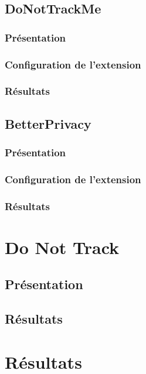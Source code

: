 \subsection{DoNotTrackMe}
\subsubsection{Présentation}
\subsubsection{Configuration de l'extension}
\subsubsection{Résultats}

\subsection{BetterPrivacy}
\subsubsection{Présentation}
\subsubsection{Configuration de l'extension}
\subsubsection{Résultats}

\section{Do Not Track}
\subsection{Présentation}
\subsection{Résultats}


\section{Résultats}
\label{results_plugins}

